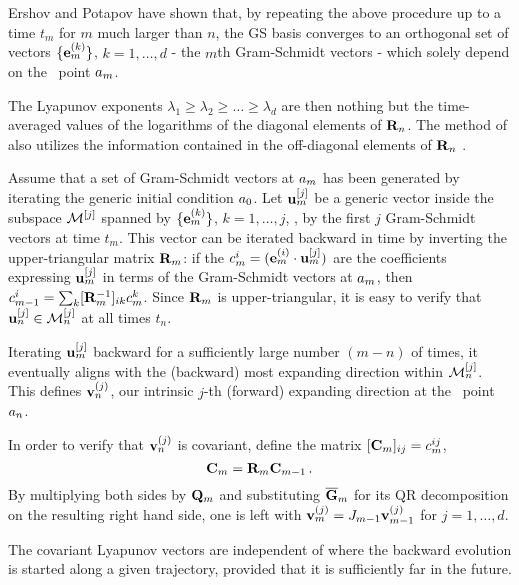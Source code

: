 Ershov and Potapov
have shown that, by repeating the above
procedure up to a time $t_m$ for $m$ much larger than $n$,
the GS basis converges to an orthogonal set of vectors
$\{{\bf e}_m^{(k)}\}$, $k=1,\ldots, d$ - the $m$th Gram-Schmidt
vectors - which solely depend on the \statesp\ point
$a_{m}$.

The Lyapunov exponents $\lambda_1 \geq \lambda_2 \geq \ldots \geq \lambda_d$
are then nothing but the time-averaged values of the
logarithms of the diagonal elements of ${\bf R}_n$.
The method of  also utilizes the
information contained in the off-diagonal elements of ${\bf R}_n$ .

Assume that a set of Gram-Schmidt vectors at $a_m$ has
been generated by iterating the generic initial condition
$a_0$. Let ${\bf u}_m^{[j]}$ be a generic vector inside
the subspace ${\cal M}^{[j]}$ spanned by $\{{\bf e}_m^{(k)}\}$,
$k=1,\ldots, j$, \ie, by the first $j$ Gram-Schmidt vectors
at time $t_m$. This vector can be iterated backward in time
by inverting the upper-triangular matrix ${\bf R}_m$: if the
$c_m^{i}=({\bf e}_m^{(i)} \cdot {\bf u}_m^{[j]} )$ are the
coefficients expressing ${\bf u}_m^{[j]}$ in terms of the
Gram-Schmidt vectors at $a_m$, then $c_{m-1}^{i}= \sum_k
[{\bf R}_m^{-1}]_{ik} c_m^{k}$. Since ${\bf R}_m$ is
upper-triangular, it is easy to verify that ${\bf u}_n^{[j]}
\in {\cal M}^{[j]}_n$ at all times $t_n$.


Iterating ${\bf u}_m^{[j]}$ backward for a sufficiently large
number $(m-n)$ of times, it eventually aligns with the
(backward) most expanding direction within ${\cal M}^{[j]}_n$.
This defines  ${\bf v}_n^{(j)}$, our intrinsic $j$-th
(forward) expanding direction at the \statesp\ point
$a_n$.

In order to verify that ${\bf v}_n^{(j)}$ is covariant,
define the matrix $[{\bf C}_m]_{ij} = c_m^{ij}$,
\[
{\bf C}_m = {\bf R}_m {\bf C}_{m-1}
\,.
\]
By multiplying both sides by ${\bf Q}_m$ and substituting
$\overline {\bf G}_m$ for its QR decomposition on the
resulting right hand side, one is left with ${\bf
v}_{m}^{(j)}=J_{m-1} {\bf v}_{m-1}^{(j)}$ for
$j=1,\ldots, d$.

The covariant Lyapunov vectors are independent of where the
backward evolution is started along a given trajectory,
provided that it is sufficiently far in the future.

